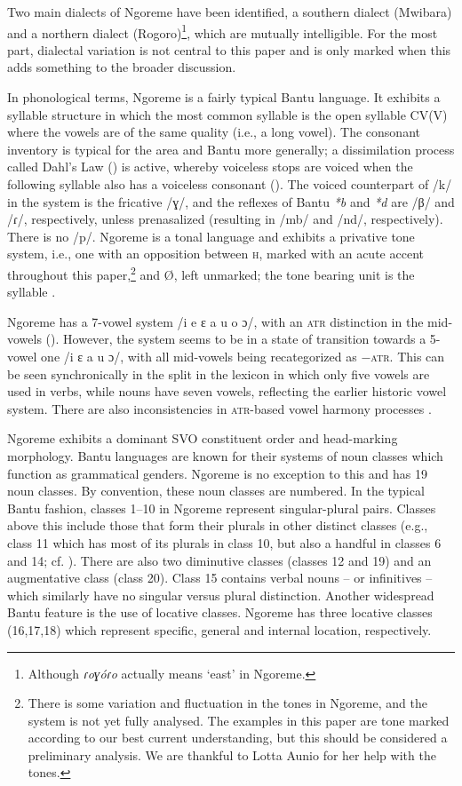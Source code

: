 \documentclass[output=paper,colorlinks,citecolor=brown,draftmode]{langscibook}
\begin{document}
Two main dialects of Ngoreme have been identified, a southern dialect (Mwibara) and a northern dialect (Rogoro)\footnote{Although \textit{ɾoɣóɾo} actually means ‘east’ in Ngoreme.}, which are mutually intelligible. For the most part, dialectal variation is not central to this paper and is only marked when this adds something to the broader discussion. 

In phonological terms, Ngoreme is a fairly typical Bantu language. It exhibits a syllable structure in which the most common syllable is the open syllable CV(V) where the vowels are of the same quality (i.e., a long vowel). The consonant inventory is typical for the area and Bantu more generally; a dissimilation process called Dahl’s Law (\citealt{DavyNurse1982}) is active, whereby voiceless stops are voiced when the following syllable also has a voiceless consonant (\citealt[507]{AunioEtAl2019}). The voiced counterpart of /k/ in the system is the fricative /ɣ/, and the reflexes of Bantu \textit{*b} and \textit{*d} are /β/ and /ɾ/, respectively, unless prenasalized (resulting in /mb/ and /nd/, respectively). There is no /p/. Ngoreme is a tonal language and exhibits a privative tone system, i.e., one with an opposition between \textsc{h}, marked with an acute accent throughout this paper,\footnote{There is some variation and fluctuation in the tones in Ngoreme, and the system is not yet fully analysed. The examples in this paper are tone marked according to our best current understanding, but this should be considered a preliminary analysis. We are thankful to Lotta Aunio for her help with the tones.} and Ø, left unmarked; the tone bearing unit is the syllable \citep[196]{Aunio2017}.

Ngoreme has a 7-vowel system /i e ɛ a u o ɔ/, with an \textsc{atr} distinction in the mid-vowels (\citealt[503]{AunioEtAl2019}). However, the system seems to be in a state of transition towards a 5-vowel one /i ɛ a u ɔ/, with all mid-vowels being recategorized as $-$\textsc{atr}. This can be seen synchronically in the split in the lexicon in which only five vowels are used in verbs, while nouns have seven vowels, reflecting the earlier historic vowel system. There are also inconsistencies in \textsc{atr}{}-based vowel harmony processes \citep[506]{AunioEtAl2019}.

Ngoreme exhibits a dominant SVO constituent order and head-marking morphology. Bantu languages are known for their systems of noun classes which function as grammatical genders. Ngoreme is no exception to this and has 19 noun classes. By convention, these noun classes are numbered. In the typical Bantu fashion, classes 1–10 in Ngoreme represent singular-plural pairs. Classes above this include those that form their plurals in other distinct classes (e.g., class 11 which has most of its plurals in class 10, but also a handful in classes 6 and 14; cf. \citealt[61--62]{Laine2023}). There are also two diminutive classes (classes 12 and 19) and an augmentative class (class 20). Class 15 contains verbal nouns – or infinitives – which similarly have no singular versus plural distinction. Another widespread Bantu feature is the use of locative classes. Ngoreme has three locative classes (16,17,18) which represent specific, general and internal location, respectively.
\end{document}
